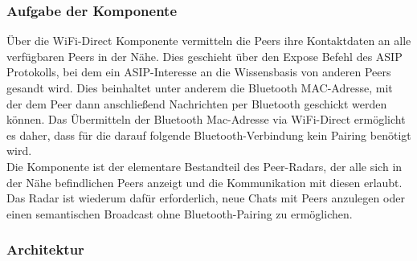\subsubsection{Aufgabe der Komponente}
Über die WiFi-Direct Komponente vermitteln die Peers ihre Kontaktdaten an alle ver\-füg\-ba\-ren Peers in der Nähe. Dies geschieht über den Expose Befehl des ASIP Protokolls, bei dem ein ASIP-Interesse an die Wissensbasis von anderen Peers gesandt wird. Dies beinhaltet unter anderem die Bluetooth MAC-Adresse, mit der dem Peer dann anschließend Nachrichten per Bluetooth geschickt werden können. Das Übermitteln der Bluetooth Mac-Adresse via WiFi-Direct ermöglicht es daher, dass für die darauf folgende Bluetooth-Verbindung kein Pairing benötigt wird. 
\\Die Komponente ist der elementare Bestandteil des Peer-Radars, der alle sich in der Nähe befindlichen Peers anzeigt und die Kommunikation mit diesen erlaubt. Das Radar ist wiederum dafür erforderlich, neue Chats mit Peers anzulegen oder einen semantischen Broadcast ohne Bluetooth-Pairing zu ermöglichen.


\subsubsection{Architektur}

\label{ch:wifioverview}

